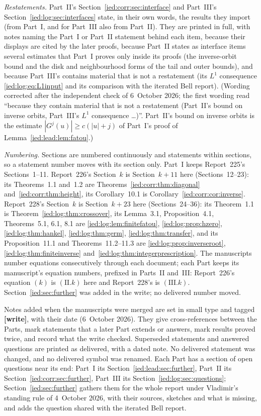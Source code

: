 \documentclass[11pt,letterpaper]{article}
\theoremstyle{remark}\newtheorem{remark}[theorem]{Remark}
\begin{document}
\emph{Restatements.} Part~II's Section~\ref{ied:corr:sec:interface} and Part~III's Section~\ref{ied:log:sec:interfaces} state, in their own words, the results they import (from Part~I, and for Part~III also from Part~II). They are printed in full, with notes naming the Part~I or Part~II statement behind each item, because their displays are cited by the later proofs, because Part~II states as interface items several estimates that Part~I proves only inside its proofs (the inverse-orbit bound and the disk and neighbourhood forms of the tail and outer bounds), and because Part~III's contains material that is not a restatement (its $L^1$ consequence \eqref{ied:log:eq:L1input} and its comparison with the iterated Bell report). \textup{(Wording corrected after the independent check of 6~October 2026; the first wording read ``because they contain material that is not a restatement (Part~II's bound on inverse orbits, Part~III's $L^1$ consequence \dots)''. Part~II's bound on inverse orbits is the estimate $|G^j(u)|\ge c(|u|+j)$ of Part~I's proof of Lemma~\ref{ied:lead:lem:fatou}.)}

\emph{Numbering.} Sections are numbered continuously and statements within sections, so a statement number moves with its section only. Part~I keeps Report~225's Sections~1--11. Report~226's Section~$k$ is Section~$k+11$ here (Sections~12--23): its Theorems~1.1 and~1.2 are Theorems~\ref{ied:corr:thm:diagonal} and~\ref{ied:corr:thm:height}, its Corollary~10.1 is Corollary~\ref{ied:corr:cor:inverse}. Report~228's Section~$k$ is Section~$k+23$ here (Sections~24--36): its Theorem~1.1 is Theorem~\ref{ied:log:thm:crossover}, its Lemma~3.1, Proposition~4.1, Theorems~5.1, 6.1, 8.1 are \ref{ied:log:lem:finitefatou}, \ref{ied:log:prop:hzero}, \ref{ied:log:thm:hankel}, \ref{ied:log:thm:germ}, \ref{ied:log:thm:transfer}, and its Proposition~11.1 and Theorems~11.2--11.3 are \ref{ied:log:prop:inverseroot}, \ref{ied:log:thm:finiteinverse} and~\ref{ied:log:thm:integerprescription}. The manuscripts number equations consecutively through each document; each Part keeps its manuscript's equation numbers, prefixed in Parts~II and~III: Report~226's equation $(k)$ is $(\mathrm{II}.k)$ here and Report~228's is $(\mathrm{III}.k)$. Section~\ref{ied:sec:further} was added in the write; no delivered number moved.

Notes added when the manuscripts were merged are set in small type and tagged \textbf{[write]}, with their date (6~October 2026). They give cross-references between the Parts, mark statements that a later Part extends or answers, mark results proved twice, and record what the write checked. Superseded statements and answered questions are printed as delivered, with a dated note. No delivered statement was changed, and no delivered symbol was renamed. Each Part has a section of open questions near its end: Part~I its Section~\ref{ied:lead:sec:further}, Part~II its Section~\ref{ied:corr:sec:further}, Part~III its Section~\ref{ied:log:sec:questions}; Section~\ref{ied:sec:further} gathers them for the whole report under Vladimir's standing rule of 4~October 2026, with their sources, sketches and what is missing, and adds the question shared with the iterated Bell report.
\end{document}
